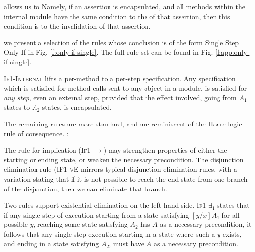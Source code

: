  allows us to
Namely, if an assertion is encapsulated, and all methods within the internal module
have the same condition to the  of that assertion, then 
this condition is    to the invalidation of that assertion.

 we present a selection of the rules whose conclusion is of the form Single Step Only If in Fig. \ref{f:only-if-single}.
 The full rule set can be found in Fig. \ref{f:app:only-if-single}.

\textsc{If1-Internal} 
 lifts a per-method \Nec {} to a per-step \Nec specification.
Any \Nec specification which is satisfied for  method
calls sent to any object in a module, is satisfied for \emph{any step}, even
an external step, provided that the effect involved, \ie going from $A_1$ states to
$A_2$ states, is encapsulated.

 The remaining rules are more standard, and are reminiscent of the Hoare logic rule of consequence.
:
 
The  rule for implication (\textsc{If1-$\longrightarrow$}) may strengthen
 properties of either the starting or ending state, or 
weaken the necessary precondition. 
%
%
The disjunction
elimination rule (\textsc{IF1-$\vee$E} mirrors typical disjunction elimination
rules, with a variation stating that if it is not possible  to reach 
the end state from one branch of the disjunction, then we can eliminate 
that branch. 

Two rules support existential elimination on the left hand side. 
\textsc{If1-$\exists_1$} states that if any single step of execution starting
from a state satisfying $[y/x]A_1$ for all possible $y$, reaching some state satisfying
$A_2$ has $A$ as a necessary precondition, it follows that any single step execution
starting in a state where such a $y$ exists, and ending in a state satisfying $A_2$,
must have $A$ as a necessary precondition.

